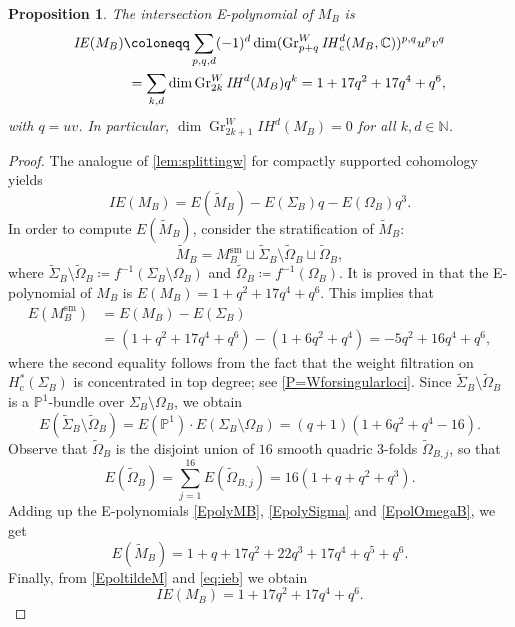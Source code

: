 \documentclass[JEP,XML,SOM,Unicode, NoEqCountersInSection,NoFloatCountersInSection,published]{cedram}
\newcommand{\cc}{\mathrm{c}}
\newcommand{\IE}{\mathit{IE}}
\newcommand{\IH}{\mathit{IH}}
\newtheorem{prop}[thm]{Proposition}
\theoremstyle{definition}
\newcommand{\CC}{\mathbb{C}}
\newcommand{\PP}{\mathbb{P}}
\newcommand{\Gr}{\operatorname{Gr}}
\newcommand{\tomega}{\widetilde{\Omega}}
\begin{document}
\begin{prop}\label{prop:Epolynomial}
The intersection E-polynomial of $M_B$ is
\begin{align*}
\IE(M_B) & \coloneqq \sum_{p,q, d}(-1)^d \dim ( \Gr^W_{p+q} \IH^d_{\cc}(M_B, \CC))^{p,q} u^pv^q\\
& \hphantom{:}= \sum_{k, d} \dim \Gr^W_{2k}\IH^d(M_B) q^k = 1+17q^2+17q^4+q^6,
\end{align*}
with $q=uv$.
In particular,
$\dim \Gr^W_{2k+1}\IH^d(M_B)=0$ for all $k, d \in \mathbb{N}$.
\end{prop}
\begin{proof}

The analogue of \cref{lem:splittingw} for compactly supported cohomology yields
\begin{equation}\label{eq:ieb}
\IE(M_B)= E(\widetilde{M}_B)- E(\Sigma_B) q - E(\Omega_B) q^3.
\end{equation}
In order to compute $E(\widetilde{M}_B)$, consider the stratification of $\widetilde{M}_B$:
\[
\widetilde{M}_B= M_B^{\mathrm{sm}}\sqcup \widetilde{\Sigma}_B\setminus \widetilde{\Omega}_B\sqcup \widetilde{\Omega}_B,
\]
where $\widetilde{\Sigma}_B\setminus \widetilde{\Omega}_B \coloneqq f^{-1}({\Sigma}_B\setminus {\Omega}_B)$ and $\widetilde{\Omega}_B \coloneqq f^{-1}(\Omega_B)$.
It is proved in \cite[\S 8.2.3]{LogaresMunozNewstead2013} that the E-polynomial of $M_B$ is $E(M_B)=1+q^2+17q^4+q^6$.
This implies that
\begin{equation}
\begin{aligned}
E(M_B^{\mathrm{sm}})& = E(M_B) - E(\Sigma_B) \label{EpolyMB}\\
& = (1+q^2+17q^4+q^6) - (1+6q^2+q^4) =-5q^2+16q^4+q^6,
\end{aligned}
\end{equation}
where the second equality follows from the fact that the weight filtration on $H_{\cc}^*(\Sigma_B)$ is concentrated in top degree; see \cref{P=Wforsingularloci}.
Since $\widetilde{\Sigma}_B\setminus \widetilde{\Omega}_B$ is a
$\PP^1$-bundle over $\Sigma_B\setminus \Omega_B$, we obtain
\[
E(\widetilde{\Sigma}_B\setminus \widetilde{\Omega}_B) =E(\PP^1) \cdot E(\Sigma_B\setminus \Omega_B) =(q+1) (1 + 6q^2+q^4 -16). \label{EpolySigma}
\]
Observe that $\widetilde{\Omega}_B$ is the disjoint union of $16$ smooth quadric $3$-folds $\tomega_{B,j}$, so that
\begin{equation}\label{EpolOmegaB}
E(\widetilde{\Omega}_B)=\sum_{j=1}^{16} E(\tomega_{B,j})= 16(1+q+q^2+q^3).
\end{equation}
Adding up the E-polynomials \eqref{EpolyMB}, \eqref{EpolySigma} and \eqref{EpolOmegaB}, we get
\begin{equation}\label{EpoltildeM}
E(\widetilde{M}_B)=1+q+17q^2+22q^3+17q^4+q^5+q^6.
\end{equation}
Finally, from \eqref{EpoltildeM} and \eqref{eq:ieb} we obtain
\begin{equation}\label{IEM_B}
\IE(M_B)=1+17q^2+17q^4+q^6.
\end{equation}


\end{proof}
\end{document}
